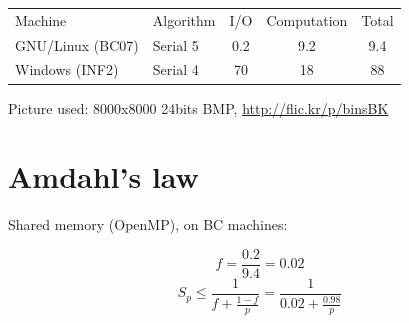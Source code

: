 \documentclass[12pt]{article}
\begin{document}
\vspace{3cm}
\begin{center}
\begin{tabular}{ l | l | c | c  || c}
    Machine & Algorithm & I/O & Computation & Total \\
    \noalign{\medskip}
    \hline \hline
    \noalign{\medskip}
    GNU/Linux (BC07) & Serial 5 & 0.2 & 9.2 & 9.4 \\
    \noalign{\medskip}
    \hline
    \noalign{\medskip}
    Windows (INF2) & Serial 4 & 70 & 18 & 88 \\
\end{tabular}
\end{center}

\vspace{3cm}
\small Picture used: 8000x8000 24bits BMP, \url{http://flic.kr/p/binsBK}

\section{Amdahl's law}

Shared memory (OpenMP), on BC machines:

$$f = \frac{0.2}{9.4} = 0.02$$
$$S_p \le \frac{1}{f + \frac{1 - f}{p}} = \frac{1}{0.02 + \frac{0.98}{p}}$$

\end{document}
